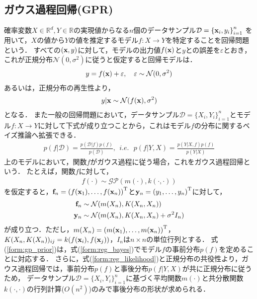 \documentclass[11pt,a4j]{jarticle}
\begin{document}
    \subsection{ガウス過程回帰(GPR)}
      確率変数$X \in \mathbb{R}^{d}, Y \in \mathbb{R}$の実現値からなる$n$個のデータサンプル$\mathcal{D} = {\{ {\bf x}_i, y_i \}}_{i=1}^n$
      を用いて，$X$の値から$Y$の値を推定するモデル$f:X \to Y$を特定することを回帰問題という．
      すべての$({\bf x}, y)$に対して，モデルの出力値$f({\bf x})$と$y$との誤差を$\varepsilon$とおき，これが正規分布$\mathcal{N}(0, \sigma^2)$に従うと仮定すると回帰モデルは．
      \begin{align}
        y = f({\bf x}) + \varepsilon, ~~~ \varepsilon \sim \mathcal{N}(0, \sigma^2)
      \end{align}
      あるいは，正規分布の再生性より，
      \begin{align}
        y | {\bf x} \sim \mathcal{N}(f({\bf x}), \sigma^2) \label{form:reg_likelihood}
      \end{align}
      となる．
      また一般の回帰問題において，データサンプル$\mathcal{D} = {\{ X_i, Y_i \}}_{i=1}^n$とモデル$f:X \to Y$に対して下式が成り立つことから，これはモデル$f$の分布に関するベイズ推論へ拡張できる．
      \begin{align}
        p(f|\mathcal{D}) = \frac{p(\mathcal{D}|f)p(f)}{p(\mathcal{D})}, ~~i.e.~~~
        p(f | Y,X) = \frac{ p( Y | X, f) p(f) }{p( Y | X )} \label{form:reg_bayes}
      \end{align}
      上のモデルにおいて，関数$f$がガウス過程に従う場合，これをガウス過程回帰という．
      たとえば，関数$f$に対して，
      \begin{align}
        f(\cdot) \sim \mathcal{GP}(m(\cdot), k(\cdot,\cdot)) \label{form:gp_prior}
      \end{align}
      を仮定すると，${\bf f}_n = { ( f({\bf x}_1),\dots,f({\bf x}_n) ) }^{\mathrm{T}}$と${\bf y}_n = {( y_1,\dots,y_n )}^{\mathrm{T}}$に対して，
      \begin{align}
        {\bf f}_n &\sim \mathcal{N}(m(X_n), K(X_n,X_n)) \\
        {\bf y}_n &\sim \mathcal{N}(m(X_n), K(X_n,X_n) + \sigma^2 I_n)
      \end{align}
      が成り立つ．ただし，$ m(X_n) = { ( m({\bf x}_1), \dots, m({\bf x}_n) ) }^{\mathrm{T}} $，
      $K(X_n,K(X_n))_{ij} = k(f({\bf x}_i), f({\bf x}_j))$，$I_n$は$n \times n$の単位行列とする．
      式(\ref{form:gp_prior})は，式(\ref{form:reg_bayes})でモデル$f$の事前分布$p(f)$を定めることに対応する．
      さらに，式(\ref{form:reg_likelihood})と正規分布の共役性より，ガウス過程回帰では，事前分布$p(f)$と事後分布$p(f|Y,X)$が共に正規分布に従うため，
      データサンプル$\mathcal{D} = {\{ X_i, Y_i \}}_{i=1}^n$に基づく平均関数$m(\cdot)$と共分散関数$k(\cdot,\cdot)$の行列計算($O(n^2)$)のみで事後分布の形状が求められる．
      
\end{document}

